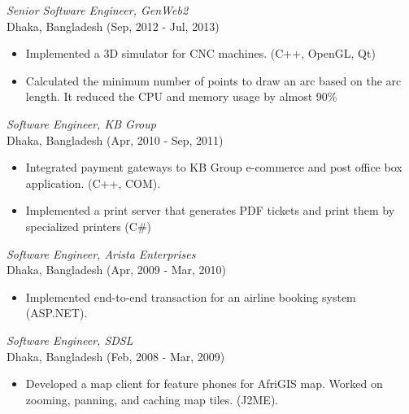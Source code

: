 \documentclass{res}
\begin{document}
\begin{resume}
{\sl Senior Software Engineer, GenWeb2} \\
Dhaka, Bangladesh (Sep, 2012 - Jul, 2013)
\begin{itemize} \itemsep -2pt
	\item  Implemented a 3D simulator for CNC machines. (C++, OpenGL, Qt) 
	\item  Calculated the minimum number of points to draw an arc based on the arc length. It reduced the CPU and memory usage by almost 90\%
\end{itemize} \vspace{-6pt}
 
{\sl Software Engineer, KB Group} \\
Dhaka, Bangladesh (Apr, 2010 - Sep, 2011)
 \begin{itemize}
 \item  Integrated payment gateways to KB Group e-commerce and post office box application. (C++, COM). 
 \item  Implemented a print server that generates PDF tickets and print them by specialized printers (C\#)
 \end{itemize} 
 
{\sl Software Engineer, Arista Enterprises}  \\
Dhaka, Bangladesh (Apr, 2009 - Mar, 2010)
\begin{itemize} 
\item  Implemented end-to-end transaction for an airline booking system (ASP.NET). 
\end{itemize}  

{\sl Software Engineer, SDSL}  \\
Dhaka, Bangladesh (Feb, 2008 - Mar, 2009)
\begin{itemize}
\item Developed a map client for feature phones for AfriGIS map. Worked on zooming, panning, and caching map tiles. (J2ME). 
\end{itemize} 
 
\vspace{0.01in} 

\end{resume}
\end{document}
